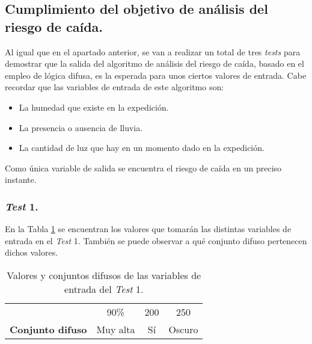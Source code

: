 \subsection{Cumplimiento del objetivo de análisis del riesgo de caída.}

Al igual que en el apartado anterior, se van a realizar un total de tres \textit{tests} para demostrar que la salida del algoritmo de análisis del riesgo de caída, basado en el empleo de lógica difusa, es la esperada para unos ciertos valores de entrada. Cabe recordar que las variables de entrada de este algoritmo son:

\begin{itemize}
\item La humedad que existe en la expedición.
\item La presencia o ausencia de lluvia.
\item La cantidad de luz que hay en un momento dado en la expedición. 
\end{itemize}

Como única variable de salida se encuentra el riesgo de caída en un preciso instante.

\subsubsection{\textit{Test} 1.}

En la Tabla \ref{table:test1} se encuentran los valores que tomarán las distintas variables de entrada en el \textit{Test} 1. También se puede observar a qué conjunto difuso pertenecen dichos valores.

\begin{table}[!h]
\centering
\begin{tabular}{l|c|c|c|}
\cline{2-4}
                                                                                    & \cellcolor[HTML]{656565}{\color[HTML]{FFFFFF} \textbf{Humedad}} & \cellcolor[HTML]{656565}{\color[HTML]{FFFFFF} \textbf{Lluvia}} & \cellcolor[HTML]{656565}{\color[HTML]{FFFFFF} \textbf{Luz}} \\ \hline
\rowcolor[HTML]{EFEFEF} 
\multicolumn{1}{|l|}{\cellcolor[HTML]{EFEFEF}{\color[HTML]{000000} \textbf{Valor}}} & {\color[HTML]{000000} 90\%}                                      & {\color[HTML]{000000} 200}                                     & {\color[HTML]{000000} 250}                                  \\ \hline
\multicolumn{1}{|l|}{{\color[HTML]{000000} \textbf{Conjunto difuso}}}               & {\color[HTML]{000000} Muy alta}                                 & {\color[HTML]{000000} Sí}                                      & {\color[HTML]{000000} Oscuro}                               \\ \hline
\end{tabular}
\caption{Valores y conjuntos difusos de las variables de entrada del \textit{Test} 1.}
\label{table:test1}
\end{table}

